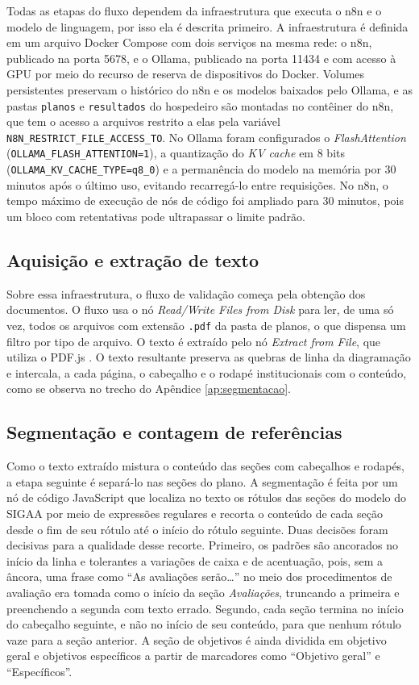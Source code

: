 Todas as etapas do fluxo dependem da infraestrutura que executa o n8n e o modelo de linguagem, por isso ela é descrita primeiro. A infraestrutura é definida em um arquivo Docker Compose com dois serviços na mesma rede: o n8n, publicado na porta 5678, e o Ollama, publicado na porta 11434 e com acesso à GPU por meio do recurso de reserva de dispositivos do Docker. Volumes persistentes preservam o histórico do n8n e os modelos baixados pelo Ollama, e as pastas \texttt{planos} e \texttt{resultados} do hospedeiro são montadas no contêiner do n8n, que tem o acesso a arquivos restrito a elas pela variável \texttt{N8N\_RESTRICT\_FILE\_ACCESS\_TO}. No Ollama foram configurados o \textit{FlashAttention} (\texttt{OLLAMA\_FLASH\_ATTENTION=1}), a quantização do \textit{KV cache} em 8 bits (\texttt{OLLAMA\_KV\_CACHE\_TYPE=q8\_0}) e a permanência do modelo na memória por 30 minutos após o último uso, evitando recarregá-lo entre requisições. No n8n, o tempo máximo de execução de nós de código foi ampliado para 30 minutos, pois um bloco com retentativas pode ultrapassar o limite padrão.

\subsection{Aquisição e extração de texto}

Sobre essa infraestrutura, o fluxo de validação começa pela obtenção dos documentos. O fluxo usa o nó \textit{Read/Write Files from Disk} para ler, de uma só vez, todos os arquivos com extensão \texttt{.pdf} da pasta de planos, o que dispensa um filtro por tipo de arquivo. O texto é extraído pelo nó \textit{Extract from File}, que utiliza o PDF.js \cite{PDFjs}. O texto resultante preserva as quebras de linha da diagramação e intercala, a cada página, o cabeçalho e o rodapé institucionais com o conteúdo, como se observa no trecho do Apêndice \ref{ap:segmentacao}.

\subsection{Segmentação e contagem de referências}

Como o texto extraído mistura o conteúdo das seções com cabeçalhos e rodapés, a etapa seguinte é separá-lo nas seções do plano. A segmentação é feita por um nó de código JavaScript que localiza no texto os rótulos das seções do modelo do SIGAA por meio de expressões regulares e recorta o conteúdo de cada seção desde o fim de seu rótulo até o início do rótulo seguinte. Duas decisões foram decisivas para a qualidade desse recorte. Primeiro, os padrões são ancorados no início da linha e tolerantes a variações de caixa e de acentuação, pois, sem a âncora, uma frase como ``As avaliações serão\ldots'' no meio dos procedimentos de avaliação era tomada como o início da seção \textit{Avaliações}, truncando a primeira e preenchendo a segunda com texto errado. Segundo, cada seção termina no início do cabeçalho seguinte, e não no início de seu conteúdo, para que nenhum rótulo vaze para a seção anterior. A seção de objetivos é ainda dividida em objetivo geral e objetivos específicos a partir de marcadores como ``Objetivo geral'' e ``Específicos''.

